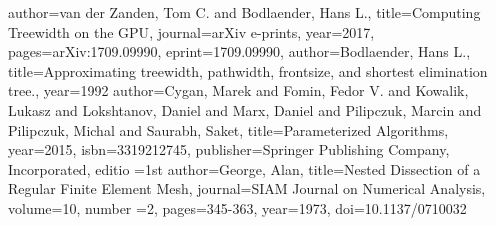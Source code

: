 \begin{bibdiv}
\begin{biblist}
 {
	author={{van der Zanden}, Tom C. and {Bodlaender}, Hans L.},
	title={Computing Treewidth on the GPU},
	journal={arXiv e-prints},
	year={2017},
	pages={arXiv:1709.09990},
	eprint={1709.09990},
}
 {
    author={{Bodlaender}, Hans L.},
    title={Approximating treewidth, pathwidth, frontsize, and shortest elimination tree.},
    year={1992}
}
 {
	author={Cygan, Marek and Fomin, Fedor V. and Kowalik, Lukasz and Lokshtanov, Daniel and Marx, Daniel and Pilipczuk, Marcin and Pilipczuk, Michal and Saurabh, Saket},
	title={Parameterized Algorithms},
	year={2015},
	isbn={3319212745},
	publisher={Springer Publishing Company, Incorporated},
	editio ={1st}
}
 {
	author={George, Alan},
	title={Nested Dissection of a Regular Finite Element Mesh},
	journal={SIAM Journal on Numerical Analysis},
	volume={10},
	number ={2},
	pages={345-363},
	year={1973},
	doi={10.1137/0710032}
}
\end{biblist}
\end{bibdiv}
